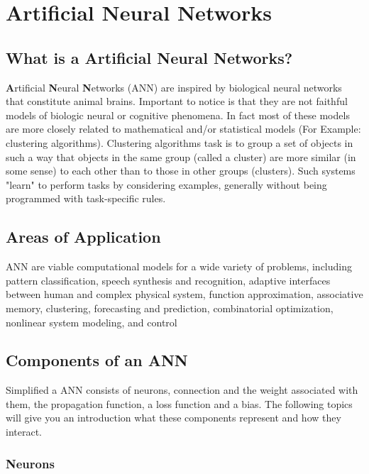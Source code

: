 \chapter{Artificial Neural Networks\authorB} \label{ref:ann}

\section{What is a Artificial Neural Networks?}

  \textbf{A}rtificial \textbf{N}eural \textbf{N}etworks (ANN) are inspired by biological neural networks that constitute animal brains. Important to notice is that they are not faithful models of biologic neural or cognitive phenomena. In fact most of these models are more closely related to mathematical and/or statistical models (For Example: clustering algorithms). Clustering algorithms  task is to group a set of objects in such a way that objects in the same group (called a cluster) are more similar (in some sense) to each other than to those in other groups (clusters). Such systems "learn" to perform tasks by considering examples, generally without being programmed with task-specific rules. 
 
\section{Areas of Application}

 ANN are viable computational models for a wide variety of problems, including pattern classification, speech synthesis and recognition, adaptive interfaces between human and complex physical system, function approximation, associative memory, clustering, forecasting and prediction, combinatorial optimization, nonlinear system modeling, and control
 \cite{fundamentals_ann}
 
\section{Components of an ANN}

Simplified a ANN consists of neurons, connection and the weight associated with them, the propagation function, a loss function and a bias. The following topics will give you an introduction what these components represent and how they interact. 

\subsection{Neurons}

